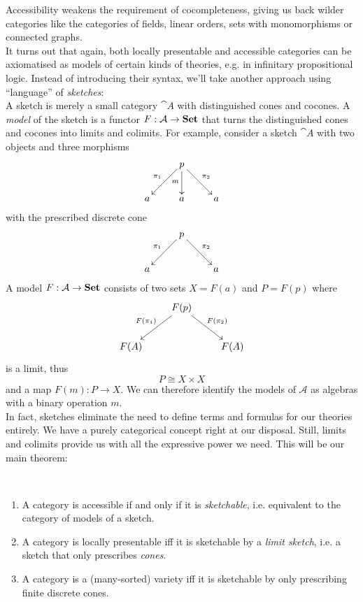 Accessibility weakens the requirement of cocompleteness, giving us back wilder categories like the categories of fields, linear orders, sets with monomorphisms or connected graphs. \\

It turns out that again, both locally presentable and accessible categories can be axiomatised as models of certain kinds of theories, e.g. in infinitary propositional logic. Instead of introducing their syntax, we'll take another approach using ``language'' of \emph{sketches}: \\

A sketch is merely a small category $\cat A$ with distinguished cones and cocones. A \emph{model} of the sketch is a functor $F : \mathcal{A} \to \mathbf{Set}$ that turns the distinguished cones and cocones into limits and colimits. For example, consider a sketch $\cat A$ with two objects and three morphisms
\[
\xymatrix{
  & p \ar[rd]^{\pi_2} \ar[d]_{m} \ar[ld]_{\pi_1} & \\
a & a & a
}\]
with the prescribed discrete cone
\[
\xymatrix{
  & p \ar[rd]^{\pi_2} \ar[ld]_{\pi_1} & \\
a & & a
}\]
A model $F : \mathcal{A} \to \mathbf{Set}$ consists of two sets $X=F(a)$ and $P=F(p)$ where
\[
\xymatrix{
  & F(p) \ar[rd]^{F(\pi_2)} \ar[ld]_{F(\pi_1)} & \\
F(A) & & F(A)
}\]
is a limit, thus \[ P \cong X \times X \] 
and a map $F(m) : P \to X$. We can therefore identify the models of $\mathcal A$ as algebras with a binary operation $m$. \\

In fact, sketches eliminate the need to define terms and formulas for our theories entirely. We have a purely categorical concept right at our disposal. Still, limits and colimits provide us with all the expressive power we need. This will be our main theorem:

\begin{Theorem}[Sketchability]\ \\
\begin{enumerate}
\item A category is accessible if and only if it is \emph{sketchable}, i.e. equivalent to the category of models of a sketch. 

\item A category is locally presentable iff it is sketchable by a \emph{limit sketch}, i.e. a sketch that only prescribes \emph{cones}.

\item A category is a (many-sorted) variety iff it is sketchable by only prescribing finite discrete cones.
\end{enumerate}
\end{Theorem}

